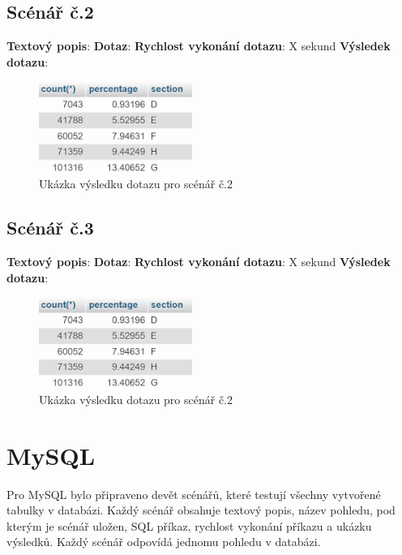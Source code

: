 \subsection{Scénář č.2}
\textbf{Textový popis}: 
\newline
\textbf{Dotaz}: 
\newline
\textbf{Rychlost vykonání dotazu}: \textpm X sekund
\newline
\textbf{Výsledek dotazu}:
\begin{figure}[H]
\centering
\includegraphics[width=5cm]{img/scenare/scenar_2}
\caption{Ukázka výsledku dotazu pro scénář č.2}
\label{fig:scenar2}
\end{figure}

\subsection{Scénář č.3}
\textbf{Textový popis}: 
\newline
\textbf{Dotaz}: 
\newline
\textbf{Rychlost vykonání dotazu}: \textpm X sekund
\newline
\textbf{Výsledek dotazu}:
\begin{figure}[H]
\centering
\includegraphics[width=5cm]{img/scenare/scenar_2}
\caption{Ukázka výsledku dotazu pro scénář č.2}
\label{fig:scenar2}
\end{figure}

\newpage
\section{MySQL} \label{sec:efektivni_vytezovani_sql}
Pro MySQL bylo připraveno devět scénářů, které testují všechny vytvořené tabulky v databázi. Každý scénář obsahuje textový popis, název pohledu, pod kterým je scénář uložen, SQL příkaz, rychlost vykonání příkazu a ukázku výsledků. Každý scénář odpovídá jednomu pohledu v databázi.

